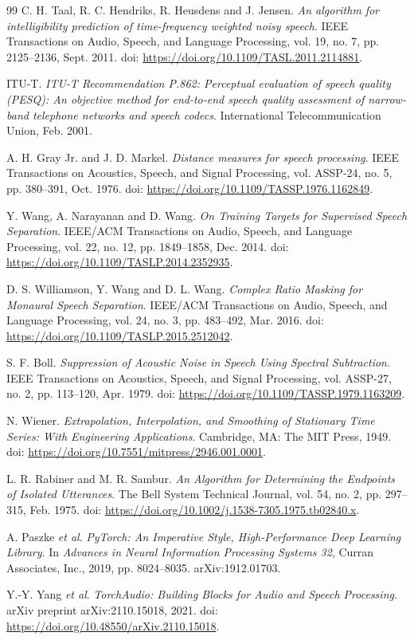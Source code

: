 \documentclass[12pt,a4paper]{report}
\begin{document}
\begin{thebibliography}{99}
C. H. Taal, R. C. Hendriks, R. Heusdens and J. Jensen.
\textit{An algorithm for intelligibility prediction of time-frequency weighted
noisy speech}. IEEE Transactions on Audio, Speech, and Language Processing,
vol. 19, no. 7, pp. 2125--2136, Sept. 2011.
doi: \url{https://doi.org/10.1109/TASL.2011.2114881}.

ITU-T.
\textit{ITU-T Recommendation P.862: Perceptual evaluation of speech quality (PESQ):
An objective method for end-to-end speech quality assessment of narrow-band
telephone networks and speech codecs}.
International Telecommunication Union, Feb. 2001.

A. H. Gray Jr. and J. D. Markel.
\textit{Distance measures for speech processing}.
IEEE Transactions on Acoustics, Speech, and Signal Processing,
vol. ASSP-24, no. 5, pp. 380--391, Oct. 1976.
doi: \url{https://doi.org/10.1109/TASSP.1976.1162849}.

Y. Wang, A. Narayanan and D. Wang.
\textit{On Training Targets for Supervised Speech Separation}.
IEEE/ACM Transactions on Audio, Speech, and Language Processing,
vol. 22, no. 12, pp. 1849--1858, Dec. 2014.
doi: \url{https://doi.org/10.1109/TASLP.2014.2352935}.

D. S. Williamson, Y. Wang and D. L. Wang.
\textit{Complex Ratio Masking for Monaural Speech Separation}.
IEEE/ACM Transactions on Audio, Speech, and Language Processing,
vol. 24, no. 3, pp. 483--492, Mar. 2016.
doi: \url{https://doi.org/10.1109/TASLP.2015.2512042}.

S. F. Boll.
\textit{Suppression of Acoustic Noise in Speech Using Spectral Subtraction}.
IEEE Transactions on Acoustics, Speech, and Signal Processing,
vol. ASSP-27, no. 2, pp. 113--120, Apr. 1979.
doi: \url{https://doi.org/10.1109/TASSP.1979.1163209}.

N. Wiener.
\textit{Extrapolation, Interpolation, and Smoothing of Stationary Time Series:
With Engineering Applications}.
Cambridge, MA: The MIT Press, 1949.
doi: \url{https://doi.org/10.7551/mitpress/2946.001.0001}.

L. R. Rabiner and M. R. Sambur.
\textit{An Algorithm for Determining the Endpoints of Isolated Utterances}.
The Bell System Technical Journal, vol. 54, no. 2, pp. 297--315, Feb. 1975.
doi: \url{https://doi.org/10.1002/j.1538-7305.1975.tb02840.x}.

A. Paszke \textit{et al}.
\textit{PyTorch: An Imperative Style, High-Performance Deep Learning Library}.
In \textit{Advances in Neural Information Processing Systems 32},
Curran Associates, Inc., 2019, pp. 8024--8035.
arXiv:1912.01703.

Y.-Y. Yang \textit{et al}.
\textit{TorchAudio: Building Blocks for Audio and Speech Processing}.
arXiv preprint arXiv:2110.15018, 2021.
doi: \url{https://doi.org/10.48550/arXiv.2110.15018}.

\end{thebibliography}
\end{document}
